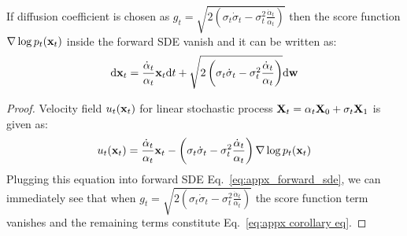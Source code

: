 \begin{corollary}
If diffusion coefficient is chosen as $g_t=\sqrt{2\left( \sigma_t \dot{\sigma}_t-\sigma_t^2\frac{\dot{\alpha}_t} {\alpha_t} \right)}$ then the score function $\nabla\log p_t(\mathbf{x}_t)$ inside the forward SDE vanish and it can be written as:
\begin{align}
    \label{eq:appx corollary eq}
    \mathrm{d} \mathbf{x}_t=\frac{\dot{\alpha}_t} {\alpha_t}\mathbf{x}_t \mathrm{d} t + \sqrt{2\left( \sigma_t \dot{\sigma}_t-\sigma_t^2\frac{\dot{\alpha}_t} {\alpha_t} \right)} \mathrm{d} \mathbf{w}
\end{align}
\end{corollary}
\begin{proof}
    Velocity field $u_t(\mathbf{x}_t)$ for linear stochastic process $\mathbf{X}_t=\alpha_t \mathbf{X}_0+\sigma_t\mathbf{X}_1$ is given as:
    \begin{align}
        u_t(\mathbf{x}_t)=\frac{\dot{\alpha}_t} {\alpha_t}\mathbf{x}_t-\left( \sigma_t \dot{\sigma}_t-\sigma_t^2\frac{\dot{\alpha}_t} {\alpha_t} \right)\nabla\log p_t(\mathbf{x}_t)
    \end{align}
    Plugging this equation into forward SDE Eq.~\ref{eq:appx_forward_sde}, we can immediately see that when $g_t=\sqrt{2\left( \sigma_t \dot{\sigma}_t-\sigma_t^2\frac{\dot{\alpha}_t} {\alpha_t} \right)}$ the score function term vanishes and the remaining terms constitute Eq.~\ref{eq:appx corollary eq}.
\end{proof} 

% 

